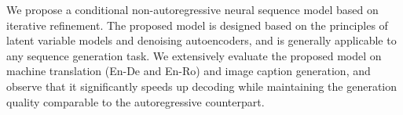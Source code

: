We propose a conditional non-autoregressive neural sequence model based on iterative refinement. The proposed model is designed based on the principles of latent variable models and denoising autoencoders, and is generally applicable to any sequence generation task. We extensively evaluate the proposed model on machine translation (En-De and En-Ro) and image caption generation, and observe that it significantly speeds up decoding while maintaining the generation quality comparable to the autoregressive counterpart.
